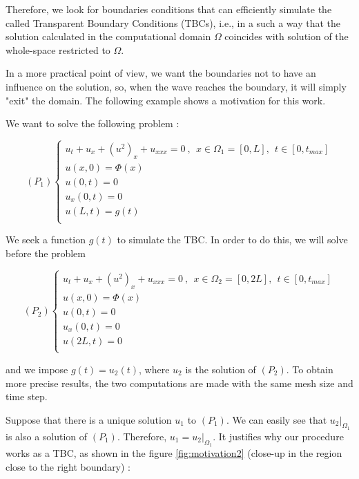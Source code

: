 \indent Therefore, we look for boundaries conditions that can efficiently simulate the called Transparent Boundary Conditions (TBCs), i.e., in a such a way that the solution calculated in the computational domain $\Omega$ coincides with solution of the whole-space restricted to $\Omega$.

\indent In a more practical point of view, we want the boundaries not to have an influence on the solution, so, when the wave reaches the boundary, it will simply "exit" the domain. The following example shows a motivation for this work.

\indent We want to solve the following problem :

\begin{equation}
    (P_1) \begin{cases}
    u_t + u_x + (u^2)_x + u_{xxx} = 0 \ , \ \ x \in \Omega_1 = [0,L], \ \ t \in [0, t_{max}] \\
    u(x,0) = \Phi(x) \\
    u(0,t) = 0 \\
    u_x(0,t) = 0 \\
    u(L,t) = g(t)  \\ 
    \end{cases}
\end{equation}

\indent We seek a function $g(t)$ to simulate the TBC. In order to do this, we will solve before the problem

\begin{equation}
    (P_2) \begin{cases}
    u_t + u_x + (u^2)_x + u_{xxx} = 0 \ , \ \ x \in \Omega_2 = [0,2L], \ \ t \in [0, t_{max}] \\
    u(x,0) = \Phi(x) \\
    u(0,t) = 0 \\
    u_x(0,t) = 0 \\
    u(2L,t) = 0  \\ 
    \end{cases}
\end{equation}

\noindent and we impose $g(t) = u_2(t)$, where $u_2$ is the solution of $(P_2)$. To obtain more precise results, the two computations are made with the same mesh size and time step.

\noindent Suppose that there is a unique solution $u_1$ to $(P_1)$. We can easily see that $u_2|_{\Omega_1}$ is also a solution of $(P_1)$. Therefore, $u_1 = u_2|_{\Omega_1}$. It justifies why our procedure works as a TBC, as shown in the figure \ref{fig:motivation2} (close-up in the region close to the right boundary) :

